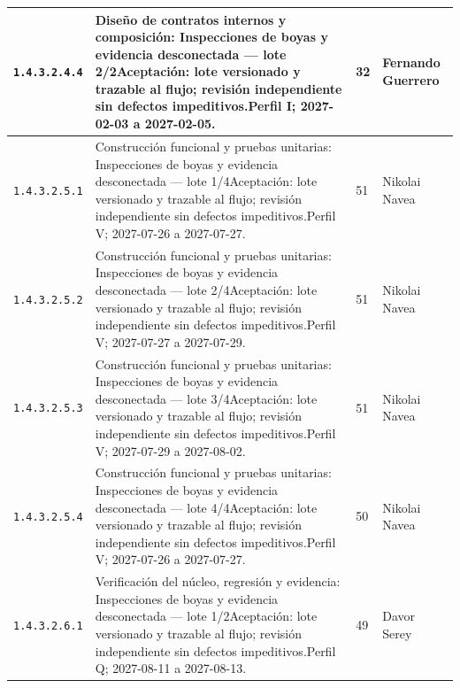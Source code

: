 \begin{longtable}{L{29mm}L{80mm}R{12mm}L{28mm}}
\texttt{1.\allowbreak{}4.\allowbreak{}3.\allowbreak{}2.\allowbreak{}4.\allowbreak{}4} & Diseño de contratos internos y composición: Inspecciones de boyas y evidencia desconectada — lote 2/2\newline Aceptación: lote versionado y trazable al flujo; revisión independiente sin defectos impeditivos.\newline Perfil I; 2027-02-03 a 2027-02-05. & 32 & Fernando Guerrero\\\hline
\texttt{1.\allowbreak{}4.\allowbreak{}3.\allowbreak{}2.\allowbreak{}5.\allowbreak{}1} & Construcción funcional y pruebas unitarias: Inspecciones de boyas y evidencia desconectada — lote 1/4\newline Aceptación: lote versionado y trazable al flujo; revisión independiente sin defectos impeditivos.\newline Perfil V; 2027-07-26 a 2027-07-27. & 51 & Nikolai Navea\\\hline
\texttt{1.\allowbreak{}4.\allowbreak{}3.\allowbreak{}2.\allowbreak{}5.\allowbreak{}2} & Construcción funcional y pruebas unitarias: Inspecciones de boyas y evidencia desconectada — lote 2/4\newline Aceptación: lote versionado y trazable al flujo; revisión independiente sin defectos impeditivos.\newline Perfil V; 2027-07-27 a 2027-07-29. & 51 & Nikolai Navea\\\hline
\texttt{1.\allowbreak{}4.\allowbreak{}3.\allowbreak{}2.\allowbreak{}5.\allowbreak{}3} & Construcción funcional y pruebas unitarias: Inspecciones de boyas y evidencia desconectada — lote 3/4\newline Aceptación: lote versionado y trazable al flujo; revisión independiente sin defectos impeditivos.\newline Perfil V; 2027-07-29 a 2027-08-02. & 51 & Nikolai Navea\\\hline
\texttt{1.\allowbreak{}4.\allowbreak{}3.\allowbreak{}2.\allowbreak{}5.\allowbreak{}4} & Construcción funcional y pruebas unitarias: Inspecciones de boyas y evidencia desconectada — lote 4/4\newline Aceptación: lote versionado y trazable al flujo; revisión independiente sin defectos impeditivos.\newline Perfil V; 2027-07-26 a 2027-07-27. & 50 & Nikolai Navea\\\hline
\texttt{1.\allowbreak{}4.\allowbreak{}3.\allowbreak{}2.\allowbreak{}6.\allowbreak{}1} & Verificación del núcleo, regresión y evidencia: Inspecciones de boyas y evidencia desconectada — lote 1/2\newline Aceptación: lote versionado y trazable al flujo; revisión independiente sin defectos impeditivos.\newline Perfil Q; 2027-08-11 a 2027-08-13. & 49 & Davor Serey\\\hline

\end{longtable}
